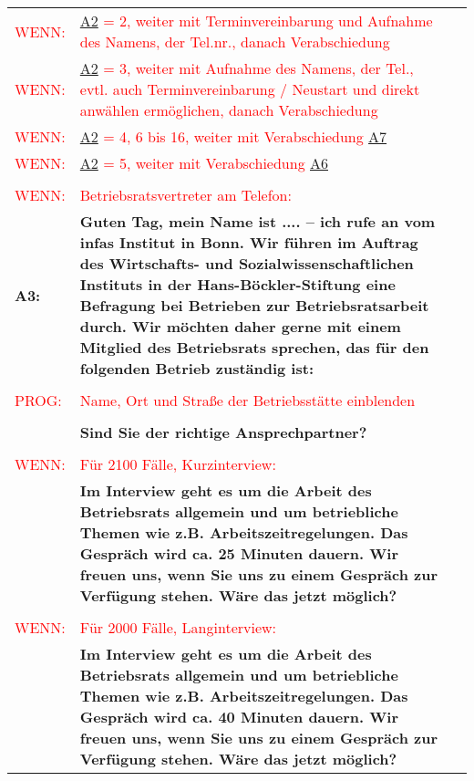 \begin{longtable}{!{\color{black}\vline width 1pt}  L{2cm}!{\color{black}\vline width 1pt} L{12.25cm}!{\color{black}\vline width 1pt}  L{2.5cm}!{\color{black}\vline width 1pt}}
  \textcolor{red}{WENN:} & \textcolor{red}{ \hyperref[A2]{A2} = 2, weiter mit Terminvereinbarung und Aufnahme des Namens, der Tel.nr., danach Verabschiedung} &  \\ 
  \textcolor{red}{WENN:} & \textcolor{red}{ \hyperref[A2]{A2} = 3, weiter mit Aufnahme des Namens, der Tel., evtl. auch Terminvereinbarung / Neustart und direkt anwählen ermöglichen, danach Verabschiedung} &  \\ 
  \textcolor{red}{WENN:} & \textcolor{red}{ \hyperref[A2]{A2} = 4, 6 bis 16, weiter mit Verabschiedung  \hyperref[A7]{A7}} &  \\ 
  \textcolor{red}{WENN:} & \textcolor{red}{ \hyperref[A2]{A2} = 5, weiter mit Verabschiedung  \hyperref[A6]{A6}} &  \\ 
   &  &  \\ 
   \midrule
\textcolor{red}{WENN:} & \textcolor{red}{Betriebsratsvertreter am Telefon:} &  \\ 
  \textbf{A3:}\label{A3} & \textbf{Guten Tag, mein Name ist .... – ich rufe an vom infas Institut in Bonn. Wir führen im Auftrag des Wirtschafts- und Sozialwissenschaftlichen Instituts in der Hans-Böckler-Stiftung eine Befragung bei Betrieben zur Betriebsratsarbeit durch. Wir möchten daher gerne mit einem Mitglied des Betriebsrats sprechen, das für den folgenden Betrieb zuständig ist:} &  \\ 
   &  &  \\ 
  \textcolor{red}{PROG:} & \textcolor{red}{Name, Ort und Straße der Betriebsstätte einblenden} &  \\ 
   &  &  \\ 
   & \textbf{Sind Sie der richtige Ansprechpartner?} &  \\ 
   &  &  \\ 
  \textcolor{red}{WENN:} & \textcolor{red}{Für 2100 Fälle, Kurzinterview\label{langkurz}:} &  \\ 
   & \textbf{Im Interview geht es um die Arbeit des Betriebsrats allgemein und um betriebliche Themen wie z.B. Arbeitszeitregelungen. Das Gespräch wird ca. 25 Minuten dauern. Wir freuen uns, wenn Sie uns zu einem Gespräch zur Verfügung stehen. Wäre das jetzt möglich?} &  \\ 
   &  &  \\ 
  \textcolor{red}{WENN:} & \textcolor{red}{Für 2000 Fälle, Langinterview:} &  \\ 
   & \textbf{Im Interview geht es um die Arbeit des Betriebsrats allgemein und um betriebliche Themen wie z.B. Arbeitszeitregelungen. Das Gespräch wird ca. 40 Minuten dauern. Wir freuen uns, wenn Sie uns zu einem Gespräch zur Verfügung stehen. Wäre das jetzt möglich?} &  \\ 

\end{longtable}
